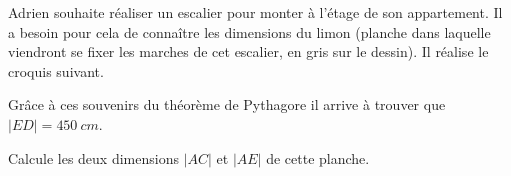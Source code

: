 %
%
    Adrien souhaite réaliser un escalier pour monter à l'étage de son appartement.
    Il a besoin pour cela de connaître les dimensions du limon (planche dans laquelle viendront se fixer les marches de cet escalier, en gris sur le dessin).
    Il réalise le croquis suivant.
    \begin{center}
        
    \end{center}

    Grâce à ces souvenirs du théorème de Pythagore il arrive à trouver que $|ED|=\SI{450}{cm}$.

    Calcule les deux dimensions $|AC|$ et $|AE|$ de cette planche.

